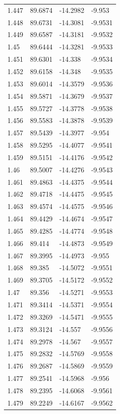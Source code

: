 \begin{tabular}{llll}
1.447 & 89.6874 & -14.2982 & -9.953 \\
1.448 & 89.6731 & -14.3081 & -9.9531 \\
1.449 & 89.6587 & -14.3181 & -9.9532 \\
1.45 & 89.6444 & -14.3281 & -9.9533 \\
1.451 & 89.6301 & -14.338 & -9.9534 \\
1.452 & 89.6158 & -14.348 & -9.9535 \\
1.453 & 89.6014 & -14.3579 & -9.9536 \\
1.454 & 89.5871 & -14.3679 & -9.9537 \\
1.455 & 89.5727 & -14.3778 & -9.9538 \\
1.456 & 89.5583 & -14.3878 & -9.9539 \\
1.457 & 89.5439 & -14.3977 & -9.954 \\
1.458 & 89.5295 & -14.4077 & -9.9541 \\
1.459 & 89.5151 & -14.4176 & -9.9542 \\
1.46 & 89.5007 & -14.4276 & -9.9543 \\
1.461 & 89.4863 & -14.4375 & -9.9544 \\
1.462 & 89.4718 & -14.4475 & -9.9545 \\
1.463 & 89.4574 & -14.4575 & -9.9546 \\
1.464 & 89.4429 & -14.4674 & -9.9547 \\
1.465 & 89.4285 & -14.4774 & -9.9548 \\
1.466 & 89.414 & -14.4873 & -9.9549 \\
1.467 & 89.3995 & -14.4973 & -9.955 \\
1.468 & 89.385 & -14.5072 & -9.9551 \\
1.469 & 89.3705 & -14.5172 & -9.9552 \\
1.47 & 89.356 & -14.5271 & -9.9553 \\
1.471 & 89.3414 & -14.5371 & -9.9554 \\
1.472 & 89.3269 & -14.5471 & -9.9555 \\
1.473 & 89.3124 & -14.557 & -9.9556 \\
1.474 & 89.2978 & -14.567 & -9.9557 \\
1.475 & 89.2832 & -14.5769 & -9.9558 \\
1.476 & 89.2687 & -14.5869 & -9.9559 \\
1.477 & 89.2541 & -14.5968 & -9.956 \\
1.478 & 89.2395 & -14.6068 & -9.9561 \\
1.479 & 89.2249 & -14.6167 & -9.9562 \\

\end{tabular}
